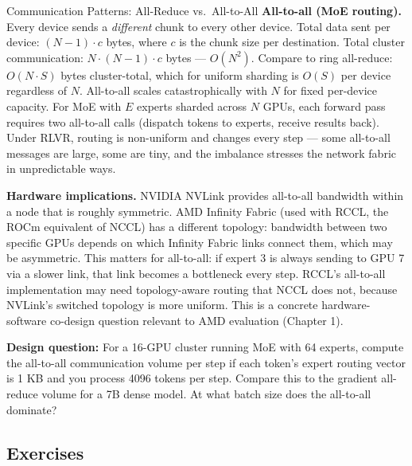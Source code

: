 \begin{thinkfirst}{Communication Patterns: All-Reduce vs.\ All-to-All}
\medskip
\textbf{All-to-all (MoE routing).}
Every device sends a \emph{different} chunk to every other device.
Total data sent per device: $(N-1) \cdot c$ bytes, where $c$ is the chunk size per destination.
Total cluster communication: $N \cdot (N-1) \cdot c$ bytes --- $O(N^2)$.
Compare to ring all-reduce: $O(N \cdot S)$ bytes cluster-total, which for uniform sharding is
$O(S)$ per device regardless of $N$.
All-to-all scales catastrophically with $N$ for fixed per-device capacity.
For MoE with $E$ experts sharded across $N$ GPUs, each forward pass requires two all-to-all calls
(dispatch tokens to experts, receive results back).
Under RLVR, routing is non-uniform and changes every step --- some all-to-all messages are large,
some are tiny, and the imbalance stresses the network fabric in unpredictable ways.

\medskip
\textbf{Hardware implications.}
NVIDIA NVLink provides all-to-all bandwidth within a node that is roughly symmetric.
AMD Infinity Fabric (used with RCCL, the ROCm equivalent of NCCL) has a different topology:
bandwidth between two specific GPUs depends on which Infinity Fabric links connect them,
which may be asymmetric.
This matters for all-to-all: if expert 3 is always sending to GPU 7 via a slower link,
that link becomes a bottleneck every step.
RCCL's all-to-all implementation may need topology-aware routing that NCCL does not,
because NVLink's switched topology is more uniform.
This is a concrete hardware-software co-design question relevant to AMD evaluation (Chapter 1).

\medskip
\textbf{Design question:} For a 16-GPU cluster running MoE with 64 experts, compute the all-to-all
communication volume per step if each token's expert routing vector is 1 KB and you process 4096
tokens per step.
Compare this to the gradient all-reduce volume for a 7B dense model.
At what batch size does the all-to-all dominate?
\end{thinkfirst}

\subsection*{Exercises}

